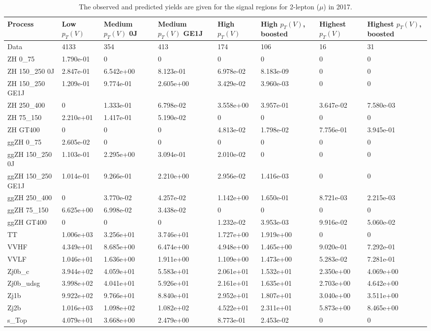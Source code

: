 \begin{table}
\centering
\caption[2017 2-lepton ($\mu$) signal selection yields]{
                  The observed and predicted yields are given for the
                  signal regions for 2-lepton ($\mu$) in 2017.
                  }
{\footnotesize
\begin{tabularx}{\textwidth}{|X|X|X|X|X|X|X|X|}
\hline
Process & Low $p_{T}(V)$ & Medium $p_{T}(V)$ 0J & Medium $p_{T}(V)$ GE1J & High $p_{T}(V)$ & High $p_{T}(V)$, boosted & Highest $p_{T}(V)$ & Highest $p_{T}(V)$, boosted \\
\hline
Data & 4133 & 354 & 413 & 174 & 106 & 16 & 31 \\
\hline
ZH 0\_75 & 1.790e-01 & 0 & 0 & 0 & 0 & 0 & 0 \\
ZH 150\_250 0J & 2.847e-01 & 6.542e+00 & 8.123e-01 & 6.978e-02 & 8.183e-09 & 0 & 0 \\
ZH 150\_250 GE1J & 1.209e-01 & 9.774e-01 & 2.605e+00 & 3.429e-02 & 3.960e-03 & 0 & 0 \\
ZH 250\_400 & 0 & 1.333e-01 & 6.798e-02 & 3.558e+00 & 3.957e-01 & 3.647e-02 & 7.580e-03 \\
ZH 75\_150 & 2.210e+01 & 1.417e-01 & 5.190e-02 & 0 & 0 & 0 & 0 \\
ZH GT400 & 0 & 0 & 0 & 4.813e-02 & 1.798e-02 & 7.756e-01 & 3.945e-01 \\
ggZH 0\_75 & 2.605e-02 & 0 & 0 & 0 & 0 & 0 & 0 \\
ggZH 150\_250 0J & 1.103e-01 & 2.295e+00 & 3.094e-01 & 2.010e-02 & 0 & 0 & 0 \\
ggZH 150\_250 GE1J & 1.014e-01 & 9.266e-01 & 2.210e+00 & 2.956e-02 & 1.416e-03 & 0 & 0 \\
ggZH 250\_400 & 0 & 3.770e-02 & 4.257e-02 & 1.142e+00 & 1.650e-01 & 8.721e-03 & 2.215e-03 \\
ggZH 75\_150 & 6.625e+00 & 6.998e-02 & 3.438e-02 & 0 & 0 & 0 & 0 \\
ggZH GT400 & 0 & 0 & 0 & 1.232e-02 & 3.953e-03 & 9.916e-02 & 5.060e-02 \\
\hline
TT & 1.006e+03 & 3.256e+01 & 3.746e+01 & 1.727e+00 & 1.919e+00 & 0 & 0 \\
VVHF & 4.349e+01 & 8.685e+00 & 6.474e+00 & 4.948e+00 & 1.465e+00 & 9.020e-01 & 7.292e-01 \\
VVLF & 1.046e+01 & 1.636e+00 & 1.911e+00 & 1.109e+00 & 1.473e+00 & 5.283e-02 & 7.281e-01 \\
Zj0b\_c & 3.944e+02 & 4.059e+01 & 5.583e+01 & 2.061e+01 & 1.532e+01 & 2.350e+00 & 4.069e+00 \\
Zj0b\_udsg & 3.998e+02 & 4.041e+01 & 5.926e+01 & 2.161e+01 & 1.635e+01 & 2.703e+00 & 4.642e+00 \\
Zj1b & 9.922e+02 & 9.766e+01 & 8.840e+01 & 2.952e+01 & 1.807e+01 & 3.040e+00 & 3.511e+00 \\
Zj2b & 1.016e+03 & 1.098e+02 & 1.082e+02 & 4.522e+01 & 2.311e+01 & 5.873e+00 & 8.465e+00 \\
s\_Top & 4.079e+01 & 3.668e+00 & 2.479e+00 & 8.773e-01 & 2.453e-02 & 0 & 0 \\
\hline
\end{tabularx}
}
\label{tab:sr-Zmm-2017}
\end{table}

